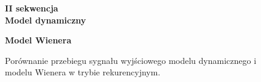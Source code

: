\begin{figure}[p!]

\begin{center}
\Large \textbf{II sekwencja} \\
\vspace{0.5cm}
\Large \textbf{Model dynamiczny}
\end{center}

\centering
{}
\hfill
{}

\begin{center}
\Large \textbf{Model Wienera}
\end{center}

\hfill
{}
\caption{Porównanie przebiegu sygnału wyjściowego modelu dynamicznego i modelu Wienera w trybie rekurencyjnym.}
\end{figure}

